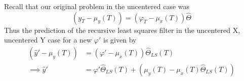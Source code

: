 Recall that our original problem in the uncentered case was
\begin{equation}
  (y_T - \mu_y(T)) = (\varphi_T - \mu_x(T))\hat\Theta
\end{equation}
Thus the prediction of the recursive least squares filter in the uncentered X, uncentered Y case for a new $\varphi'$ is given by
\begin{align}
  (\hat{y}' - \mu_y(T)) &= (\varphi' - \mu_x(T))\hat\Theta_{LS}(T) \\
  \implies \hat{y}' &= \varphi'\hat\Theta_{LS}(T) + (\mu_y(T) - \mu_x(T)\hat\Theta_{LS}(T))
\end{align}
